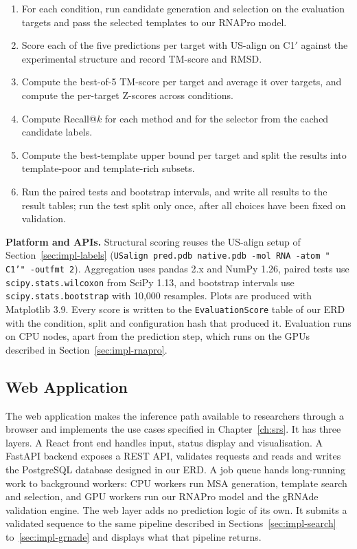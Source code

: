 \documentclass{FastFyp}
\begin{document}
\begin{enumerate}
\item For each condition, run candidate generation and selection on the evaluation targets and pass the selected templates to our RNAPro model.
\item Score each of the five predictions per target with US-align on C1$'$ against the experimental structure and record TM-score and RMSD.
\item Compute the best-of-5 TM-score per target and average it over targets, and compute the per-target Z-scores across conditions.
\item Compute Recall@$k$ for each method and for the selector from the cached candidate labels.
\item Compute the best-template upper bound per target and split the results into template-poor and template-rich subsets.
\item Run the paired tests and bootstrap intervals, and write all results to the result tables; run the test split only once, after all choices have been fixed on validation.
\end{enumerate}

\textbf{Platform and APIs.} Structural scoring reuses the US-align setup of Section~\ref{sec:impl-labels} (\texttt{USalign pred.pdb native.pdb -mol RNA -atom " C1'" -outfmt 2}). Aggregation uses pandas 2.x and NumPy 1.26, paired tests use \texttt{scipy.stats.wilcoxon} from SciPy 1.13, and bootstrap intervals use \texttt{scipy.stats.bootstrap} with 10,000 resamples. Plots are produced with Matplotlib 3.9. Every score is written to the \texttt{EvaluationScore} table of our ERD with the condition, split and configuration hash that produced it. Evaluation runs on CPU nodes, apart from the prediction step, which runs on the GPUs described in Section~\ref{sec:impl-rnapro}.

\subsection{Web Application}
\label{sec:impl-web}
The web application makes the inference path available to researchers through a browser and implements the use cases specified in Chapter~\ref{ch:srs}. It has three layers. A React front end handles input, status display and visualisation. A FastAPI backend exposes a REST API, validates requests and reads and writes the PostgreSQL database designed in our ERD. A job queue hands long-running work to background workers: CPU workers run MSA generation, template search and selection, and GPU workers run our RNAPro model and the gRNAde validation engine. The web layer adds no prediction logic of its own. It submits a validated sequence to the same pipeline described in Sections~\ref{sec:impl-search} to~\ref{sec:impl-grnade} and displays what that pipeline returns.
\end{document}
